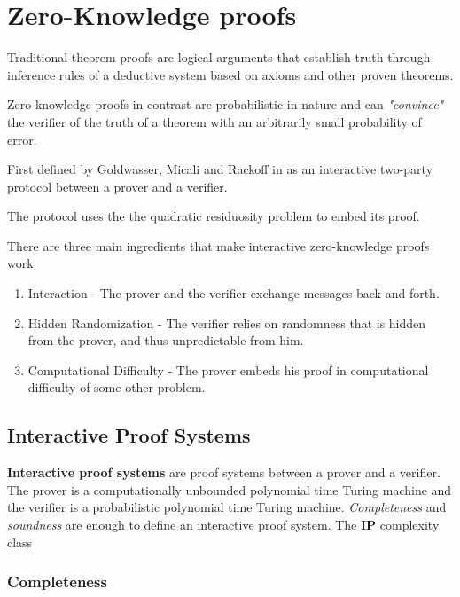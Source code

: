 \section{Zero-Knowledge proofs}

Traditional theorem proofs are logical arguments that establish truth through inference rules of a deductive system based on axioms and other proven theorems.

\bigskip

Zero-knowledge proofs in contrast are probabilistic in nature and can \textit{"convince"} the verifier of the truth of a theorem with an arbitrarily small probability of error.

\bigskip

First defined by Goldwasser, Micali and Rackoff in \cite{GMR} as an interactive two-party protocol between a prover and a verifier.

The protocol uses the the quadratic residuosity problem to embed its proof.

\bigskip

There are three main ingredients that make interactive zero-knowledge proofs work.

\begin{enumerate}
	\item Interaction - The prover and the verifier exchange messages back and forth.
	\item Hidden Randomization - The verifier relies on randomness that is hidden from the prover, and thus unpredictable from him.
	\item Computational Difficulty - The prover embeds his proof in computational difficulty of some other problem.
\end{enumerate}

\subsection{Interactive Proof Systems}
\textbf{Interactive proof systems} are proof systems between a prover and a verifier.
The prover is a computationally unbounded polynomial time Turing machine and the verifier is a probabilistic polynomial time Turing machine.
\textit{Completeness} and \textit{soundness} are enough to define an interactive proof system. The \textbf{IP} complexity class 

\subsubsection{Completeness}

